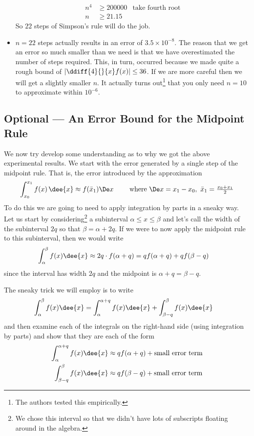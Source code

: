 \begin{eg}
\begin{itemize}
\begin{align*}
  n^4 &\geq 200000 & \text{take fourth root}\\
  n & \geq 21.15
\end{align*}
So $22$ steps of Simpson's rule will do the job.
\item $n=22$ steps actually results in an error of $3.5\times 10^{-8}$. The reason that
we get an error so much smaller than we need is that we have overestimated the number of
steps required. This, in turn, occurred because we made quite a rough bound of
$\left|\ddiff{4}{}{x}f(x)\right|\leq 36$. If we are more careful then we will get a
slightly smaller $n$. It actually turns out\footnote{The authors tested this
empirically.} that you only need $n=10$ to approximate within $10^{-6}$.
\end{itemize}
\end{eg}

\subsection{Optional --- An Error Bound for the Midpoint Rule}
We now try develop some understanding as to why we got the above experimental
results. We start with the error generated by a single step of the midpoint
rule. That is, the error introduced by the approximation
\begin{equation*}
\int_{x_0}^{x_1}f(x)\,\dee{x}\approx f(\bar x_1)\De x \qquad\hbox{ where }
\De x=x_1-x_0,\ \bar x_1=\tfrac{x_0+x_1}{2}
\end{equation*}
To do this we are going to need to apply integration by parts in a sneaky way. Let us
start by considering\footnote{We chose this interval so that we didn't have lots of
subscripts floating around in the algebra.} a subinterval $\alpha \leq x \leq
\beta$ and let's call the width of the subinterval $2q$ so that
$\beta=\alpha+2q$. If we were to now apply the midpoint rule to this
subinterval, then we would write
\begin{align*}
  \int_\alpha^\beta f(x) \dee{x} & \approx 2q \cdot f(\alpha+q) = q f(\alpha+q)
+ q f(\beta-q)
\end{align*}
since the interval has width $2q$ and the midpoint is $\alpha+q=\beta-q$.

The sneaky trick we will employ is to write
\begin{align*}
  \int_\alpha^\beta f(x) \dee{x} &= \int_\alpha^{\alpha+q}f(x)\dee{x} +
\int_{\beta-q}^\beta f(x)\dee{x}
\end{align*}
and then examine each of the integrals on the right-hand side (using integration by
parts) and show that they are each of the form
\begin{align*}
  \int_\alpha^{\alpha+q}f(x)\dee{x} & \approx q f(\alpha+q)
+ \text{small error term}\\
  \int_{\beta-q}^\beta f(x)\dee{x} &\approx q f(\beta-q)
+ \text{small error term}\\
\end{align*}


